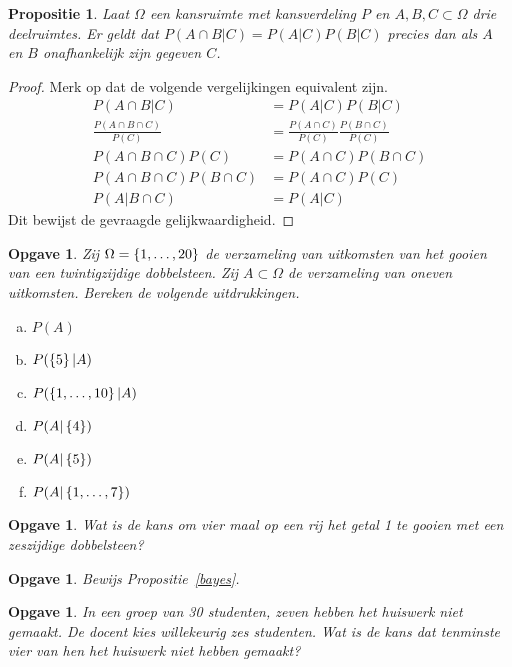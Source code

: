 \documentclass[a4paper]{book}
\newtheorem{proposition}[theorem]{Propositie}
\newtheorem{exercise}[theorem]{Opgave}
\theoremstyle{definition}
\begin{document}
\begin{proposition}
    Laat $\Omega$ een kansruimte met kansverdeling $P$ en $A,B,C \subset \Omega$ drie deelruimtes.
    Er geldt dat $P(A \cap B|C) = P(A|C)P(B|C)$ precies dan als $A$ en $B$ onafhankelijk zijn gegeven $C$.
\end{proposition}
\begin{proof}
    Merk op dat de volgende vergelijkingen equivalent zijn.
    \begin{align*}
        P(A \cap B|C)                       &= P(A|C)P(B|C) \\
        \frac{P(A \cap B \cap C)}{P(C)}     &= \frac{P(A \cap C)}{P(C)} \frac{P(B \cap C)}{P(C)} \\
        P(A \cap B \cap C)P(C)              &= P(A \cap C)P(B \cap C) \\
        P(A \cap B \cap C)P(B \cap C)       &= P(A \cap C)P(C) \\
        P(A | B \cap C)                     &= P(A | C)
    \end{align*}
    Dit bewijst de gevraagde gelijkwaardigheid.
\end{proof}


\begin{exercise}
    Zij $\Omega = \set{1,\dots,20}$ de verzameling van uitkomsten van het gooien van een twintigzijdige dobbelsteen.
    Zij $A \subset \Omega$ de verzameling van oneven uitkomsten.
    Bereken de volgende uitdrukkingen.
    \begin{enumerate}[a.]
        \item $P(A)$
        \item $P(\set{5}|A)$
        \item $P(\set{1,\dots,10}|A)$
        \item $P(A|\set{4})$
        \item $P(A|\set{5})$
        \item $P(A|\set{1,\dots,7})$
    \end{enumerate}
\end{exercise}

\begin{exercise}
Wat is de kans om vier maal op een rij het getal 1 te gooien met een zeszijdige dobbelsteen?
\end{exercise}

\begin{exercise}
    Bewijs Propositie~\ref{bayes}.
\end{exercise}

\begin{exercise}
In een groep van 30 studenten, zeven hebben het huiswerk niet gemaakt. De docent kies willekeurig zes studenten.
Wat is de kans dat tenminste vier van hen het huiswerk niet hebben gemaakt?
\end{exercise}
\end{document}
